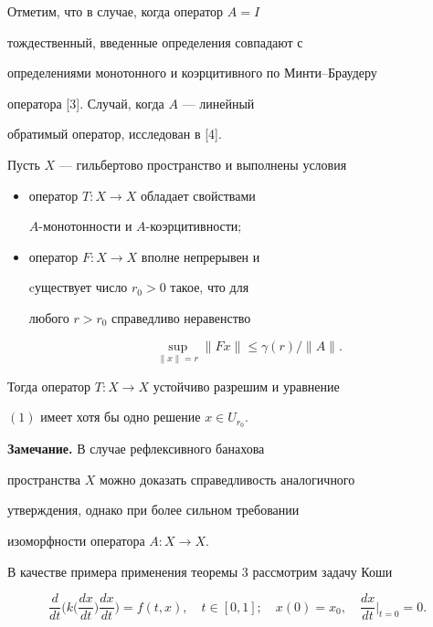 Отметим, что в случае, когда оператор $A=I$


тождественный, введенные определения совпадают с


определениями монотонного и коэрцитивного по Минти--Браудеру


оператора [3]. Случай, когда $A$ --- линейный


обратимый оператор, исследован в [4].





\begin{thm}


Пусть $X$ --- гильбертово пространство и выполнены условия


\begin{itemize}


\item[1)] оператор $T:X\to X $ обладает свойствами


$A$-монотонности и $A$-коэрцитивности$;$


\item[2)] оператор $F:X\to X $ вполне непрерывен и


cуществует число $r_0>0 $ такое, что для


любого $r>r_0$ справедливо неравенство


$$


\sup_{\| x\| =r} \| Fx\| \le \gamma ( r)/\| A\|.


$$


\end{itemize}


Тогда оператор $T:X\to X $ устойчиво разрешим и уравнение


$(1)$ имеет хотя бы одно решение $x\in U_{r_0}$.


\end{thm}





{\bf Замечание.} В случае рефлексивного банахова


пространства $X$ можно доказать справедливость аналогичного


утверждения, однако при более сильном требовании


изоморфности оператора $A:X\to X$.


\medskip





В качестве примера применения теоремы 3 рассмотрим задачу Коши


\begin{equation}


\frac{d}{dt} \bigg( k\bigg( \frac {dx}{dt} \bigg)


\frac{dx}{dt} \bigg) =f( t,x),\quad


t\in [0,1]; \quad x( 0) = x _0, \quad


\frac{dx}{dt} \bigg|_{t=0} = 0.


\end{equation}



